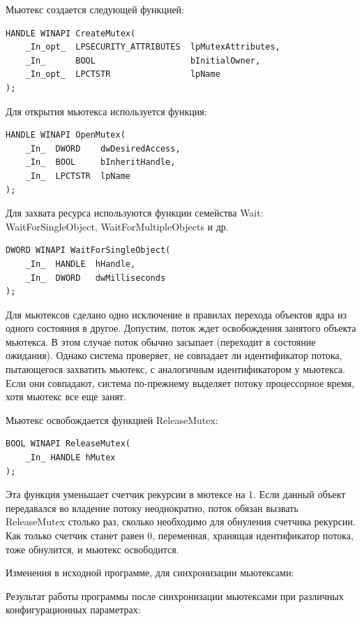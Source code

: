 \documentclass[14pt,a4paper,report]{report}
\begin{document}
Мьютекс создается следующей функцией:

\begin{verbatim}
HANDLE WINAPI CreateMutex(
    _In_opt_  LPSECURITY_ATTRIBUTES  lpMutexAttributes,
    _In_      BOOL                   bInitialOwner,
    _In_opt_  LPCTSTR                lpName
);
\end{verbatim}

Для открытия мьютекса используется функция:

\begin{verbatim}
HANDLE WINAPI OpenMutex(
    _In_  DWORD    dwDesiredAccess,
    _In_  BOOL     bInheritHandle,
    _In_  LPCTSTR  lpName
);
\end{verbatim}

Для захвата ресурса используются функции семейства Wait: WaitForSingleObject, WaitForMultipleObjects и др.

\begin{verbatim}
DWORD WINAPI WaitForSingleObject(
    _In_  HANDLE  hHandle,
    _In_  DWORD   dwMilliseconds
);
\end{verbatim}

Для мьютексов сделано одно исключение в правилах перехода объектов ядра из одного состояния в другое. Допустим, поток ждет освобождения занятого объекта мьютекса. В этом случае поток обычно засыпает (переходит в состояние ожидания). Однако система проверяет, не совпадает ли идентификатор потока, пытающегося захватить мьютекс, с аналогичным идентификатором у мьютекса. Если они совпадают, система по-прежнему выделяет потоку процессорное время, хотя мьютекс все еще занят. 

Мьютекс освобождается функцией ReleaseMutex:

\begin{verbatim}
BOOL WINAPI ReleaseMutex(
    _In_ HANDLE hMutex
);
\end{verbatim}

Эта функция уменьшает счетчик рекурсии в мютексе на 1. Если данный объект передавался во владение потоку неоднократно, поток обязан вызвать ReleaseMutex столько раз, сколько необходимо для обнуления счетчика рекурсии. Как только счетчик станет равен 0, переменная, хранящая идентификатор потока, тоже обнулится, и мьютекс освободится. 

Изменения в исходной программе, для синхронизации мьютексами:



Результат работы программы после синхронизации мьютексами при различных конфигурационных параметрах:
\end{document}
